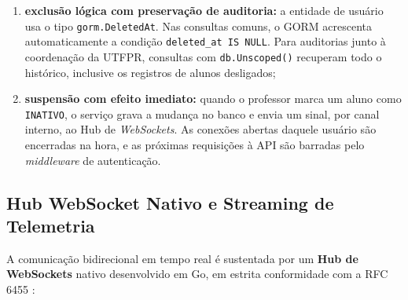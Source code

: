 \begin{enumerate}
    \item \textbf{exclusão lógica com preservação de auditoria:} a entidade de usuário usa o tipo \texttt{gorm.DeletedAt}. Nas consultas comuns, o GORM acrescenta automaticamente a condição \texttt{deleted\_at IS NULL}. Para auditorias junto à coordenação da UTFPR, consultas com \texttt{db.Unscoped()} recuperam todo o histórico, inclusive os registros de alunos desligados;

    \item \textbf{suspensão com efeito imediato:} quando o professor marca um aluno como \texttt{INATIVO}, o serviço grava a mudança no banco e envia um sinal, por canal interno, ao Hub de \textit{WebSockets}. As conexões abertas daquele usuário são encerradas na hora, e as próximas requisições à API são barradas pelo \textit{middleware} de autenticação.
\end{enumerate}

\subsection{Hub WebSocket Nativo e Streaming de Telemetria}
\label{sec:websocket-hub}

A comunicação bidirecional em tempo real é sustentada por um \textbf{Hub de WebSockets} nativo desenvolvido em Go, em estrita conformidade com a RFC 6455 \cite{fette2011websocket}:

